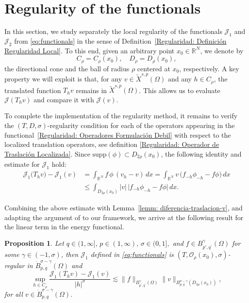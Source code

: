 \documentclass[]{amsart}
\newtheorem{proposition}[theorem]{Proposition}
\theoremstyle{definition}
\theoremstyle{definition}
\theoremstyle{remark}
\numberwithin{equation}{section}
\begin{document}
	\section{Regularity of the functionals} \label{sec:functionals}
	
	In this section, we study separately the local regularity of the functionals \(\mathcal{J}_1\) and \(\mathcal{J}_2\) from \eqref{eq:functionals} in the sense of Definition~\ref{Regularidad: Definición Regularidad Local}. To this end, given an arbitrary point \(x_0 \in \mathbb{R}^N\), we denote by
	\[
	C_\rho = C_\rho(x_0), \quad D_\rho = D_\rho(x_0),
	\]
	the directional cone and the ball of radius \(\rho\) centered at \(x_0\), respectively. A key property we will exploit is that, for any \(v \in \widetilde{X}^{s,p}(\Omega)\) and any \(h \in C_\rho\), the translated function \(T_h v\) remains in \(\widetilde{X}^{s,p}(\Omega)\). This allows us to evaluate \(\mathcal{J}(T_h v)\) and compare it with \(\mathcal{J}(v)\).
	
	To complete the implementation of the regularity method, it remains to verify the \((T, D, \sigma)\)-regularity condition for each of the operators appearing in the functional~\eqref{Regularidad: Operadores Formulación Debil} with respect to the localized translation operators, see definition \eqref{Regularidad: Operador de Traslación Localizada}. Since $\text{supp}(\phi) \subset D_{2\rho}(x_0)$, the following identity and estimate for \(\mathcal{J}_1\) hold:
\begin{align}
\mathcal{J}_{1}\bigl(T_{h} v\bigr)-\mathcal{J}_{1}(v)
&= \int_{\mathbb{R}^N} f\,\phi\,(v_h-v)\,dx
= \int_{\mathbb{R}^N} v\,\bigl(f_{-h}\phi_{-h}-f\phi\bigr)\,dx \nonumber\\
&\le \int_{D_{3\rho}(x_0)} |v|\,\bigl|f_{-h}\phi_{-h}-f\phi\bigr|\,dx.
\end{align}

Combining the above estimate with Lemma~\ref{lemm: diferencia-traslacion-v}, and adapting the argument of \cite[Proposition~3.1]{borthagaray2024quasi} to our framework, we arrive at the following result for the linear term in the energy functional.


    
   
	
	\begin{proposition} \label{prop:reg-J1}
		Let \( q \in(1, \infty], \, p \in (1, \infty), \, \sigma \in(0,1],\) and \( f \in B_{p', q^{\prime}}^{\gamma}(\Omega) \) for some \( \gamma \in(-1,\sigma) \), then \( \mathcal{J}_{1} \) defined in \eqref{eq:functionals}  is \( \left(T, \mathcal{O}_{\rho}(x_0), \sigma\right) \)-regular in \( \dot{B}_{p, q}^{\sigma-\gamma}(\Omega) \) and
		\begin{equation}
			\label{Regularidad:Regularidad F_1}
			\sup _{h \in C_{\rho}} \frac{\mathcal{J}_{1}\left(T_{h} v\right)-\mathcal{J}_{1}(v)}{|h|^{\sigma}} \lesssim\|f\|_{B_{p^{\prime}, q^{\prime}}^{\gamma}(\Omega)}\|v\|_{B_{p, q}^{\sigma-\gamma}\left(D_{3 \rho}(x_0)\right)}, 
		\end{equation}
		for all \( v \in \dot{B}_{p, q}^{\sigma-\gamma}(\Omega). \)
	\end{proposition}
	    
\end{document}
